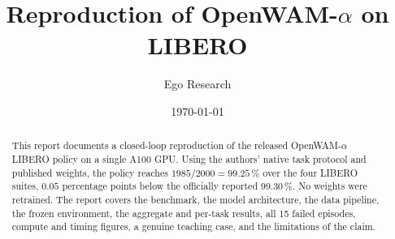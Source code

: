\documentclass[11pt, a4paper]{article}
\title{Reproduction of OpenWAM-$\alpha$ on LIBERO}
\author{Ego Research}
\date{\today}
\begin{document}
\maketitle

\begin{abstract}
  This report documents a closed-loop reproduction of the released
  OpenWAM-$\alpha$ LIBERO policy on a single A100 GPU. Using the authors' native
  task protocol and published weights, the policy reaches $1985/2000 = 99.25\,\%$
  over the four LIBERO suites, $0.05$ percentage points below the officially
  reported $99.30\,\%$. No weights were retrained. The report covers the
  benchmark, the model architecture, the data pipeline, the frozen environment,
  the aggregate and per-task results, all 15 failed episodes, compute and timing
  figures, a genuine teaching case, and the limitations of the claim.
\end{abstract}

\tableofcontents
\newpage





\end{document}
